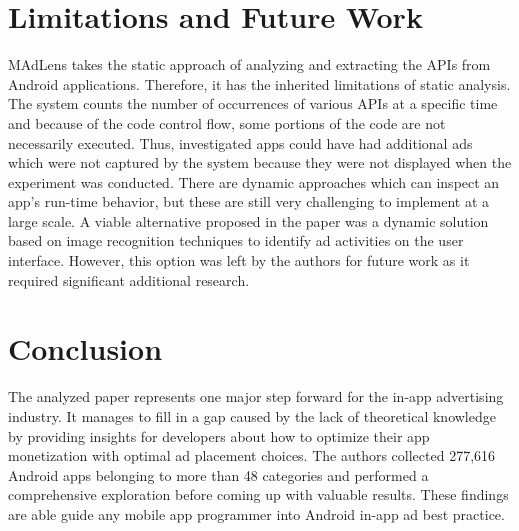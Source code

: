 \documentclass[conference]{IEEEtran}
\begin{document}
\section{Limitations and Future Work}
MAdLens takes the static approach of analyzing and extracting the APIs from Android applications. Therefore, it has the inherited limitations of static analysis. The system counts the number of occurrences of various APIs at a specific time and because of the code control flow, some portions of the code are not necessarily executed. Thus, investigated apps could have had additional ads which were not captured by the system because they were not displayed when the experiment was conducted. There are dynamic approaches which can inspect an app’s run-time behavior, but these are still very challenging to implement at a large scale. A viable alternative proposed in the paper was a dynamic solution based on image recognition techniques to identify ad activities on the user interface. However, this option was left by the authors for future work as it required significant additional research.

\section{Conclusion}
The analyzed paper represents one major step forward for the in-app advertising industry. It manages to fill in a gap caused by the lack of theoretical knowledge by providing insights for developers about how to optimize their app monetization with optimal ad placement choices. The authors collected 277,616 Android apps belonging to more than 48 categories and performed a comprehensive exploration before coming up with valuable results. These findings are able guide any mobile app programmer into Android in-app ad best practice.





\end{document}
